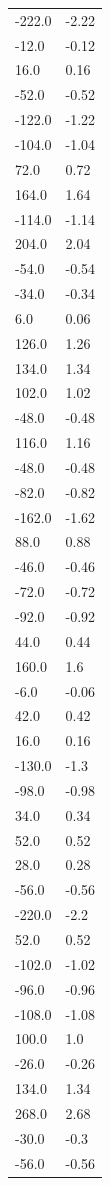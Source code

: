 \begin{longtable}{ll}
-222.0 & -2.22 \\
-12.0 & -0.12 \\
16.0 & 0.16 \\
-52.0 & -0.52 \\
-122.0 & -1.22 \\
-104.0 & -1.04 \\
72.0 & 0.72 \\
164.0 & 1.64 \\
-114.0 & -1.14 \\
204.0 & 2.04 \\
-54.0 & -0.54 \\
-34.0 & -0.34 \\
6.0 & 0.06 \\
126.0 & 1.26 \\
134.0 & 1.34 \\
102.0 & 1.02 \\
-48.0 & -0.48 \\
116.0 & 1.16 \\
-48.0 & -0.48 \\
-82.0 & -0.82 \\
-162.0 & -1.62 \\
88.0 & 0.88 \\
-46.0 & -0.46 \\
-72.0 & -0.72 \\
-92.0 & -0.92 \\
44.0 & 0.44 \\
160.0 & 1.6 \\
-6.0 & -0.06 \\
42.0 & 0.42 \\
16.0 & 0.16 \\
-130.0 & -1.3 \\
-98.0 & -0.98 \\
34.0 & 0.34 \\
52.0 & 0.52 \\
28.0 & 0.28 \\
-56.0 & -0.56 \\
-220.0 & -2.2 \\
52.0 & 0.52 \\
-102.0 & -1.02 \\
-96.0 & -0.96 \\
-108.0 & -1.08 \\
100.0 & 1.0 \\
-26.0 & -0.26 \\
134.0 & 1.34 \\
268.0 & 2.68 \\
-30.0 & -0.3 \\
-56.0 & -0.56 \\

\end{longtable}
